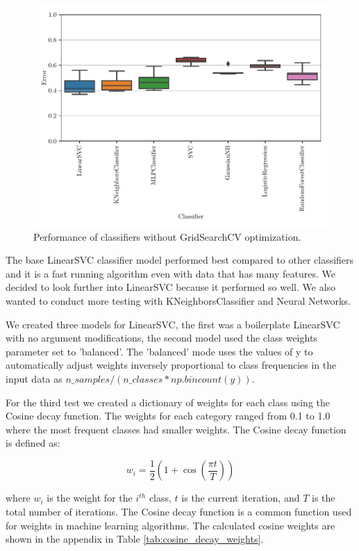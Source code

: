 \begin{figure}[ht]
  \centering
  \includegraphics[width=\scale\textwidth]{../img/plot_explore_classifiers.pdf}
  \caption{Performance of classifiers without GridSearchCV optimization.}
  \label{fig:explore_classifiers}
\end{figure} 

The base LinearSVC classifier model performed best compared to other classifiers and it is a fast running algorithm even with data that has many features. We decided to look further into LinearSVC because it performed so well. We also wanted to conduct more testing with KNeighborsClassifier and Neural Networks. 

We created three models for LinearSVC, the first was a boilerplate LinearSVC with no argument modifications, the second model used the class weights parameter set to 'balanced'. The 'balanced' mode uses the values of y to automatically adjust weights inversely proportional to class frequencies in the input data as $n\_samples / (n\_classes * np.bincount(y))$. 

For the third test we created a dictionary of weights for each class using the Cosine decay function. The weights for each category ranged from 0.1 to 1.0 where the most frequent classes had smaller weights. The Cosine decay function is defined as:

\begin{equation}
    w_i = \frac{1}{2} \left(1 + \cos \left(\frac{\pi t}{T}\right)\right)
\label{eq:cosine_decay}
\end{equation}

where $w_i$ is the weight for the $i^{th}$ class, $t$ is the current iteration, and $T$ is the total number of iterations. The Cosine decay function is a common function used for weights in machine learning algorithms. The calculated cosine weights are shown in the appendix in Table \ref{tab:cosine_decay_weights}.

